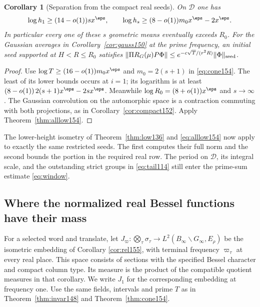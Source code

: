 \documentclass[a4paper,11pt]{article}
\newtheorem{corollary}[proposition]{Corollary}
\theoremstyle{definition}
\theoremstyle{remark}
\numberwithin{equation}{section}
\begin{document}
\begin{corollary}[Separation from the compact real seeds]
\label{cor:far154}
On \(\mathcal D\) one has
\[
          \log h_1\ge(14-o(1))s x^\eps,\qquad
          \log h_s\ge(8-o(1))m_0x^\eps-2x^\eps .
\]
In particular every one of these \(s\) geometric means
eventually exceeds \(R_0\). For the Gaussian averages in
Corollary~\ref{cor:gauss150} at the prime frequency,
an initial seed supported at \(H<R\le R_0\) satisfies
\(\|\Pi R_G(\mu)P\Phi\|\le
e^{-c\sqrt T/(r^2R)}\|\Phi\|_{\rm seed}\).
\end{corollary}
\begin{proof}
Use \(\log T\ge(16-o(1))m_0x^\eps\) and \(m_0=2(s+1)\)
in \eqref{eq:cone154}. The least of its lower bounds occurs
at \(i=1\); its logarithm is at least
\((8-o(1))\,2(s+1)x^\eps-2s x^\eps\).
Meanwhile \(\log R_0=(8+o(1))x^\eps\) and \(s\to\infty\).
The Gaussian convolution on the automorphic space is a
contraction commuting with both projections, as in
Corollary~\ref{cor:compact152}. Apply Theorem~\ref{thm:alllow154}.
\end{proof}

The lower-height isometry of Theorem~\ref{thm:low136} and
\eqref{eq:alllow154} now apply to exactly the same restricted
seeds. The first computes their full norm and the second
bounds the portion in the required real row. The period on
\(\mathcal D\), its integral scale, and the outstanding strict
groups in \eqref{eq:tail114} still enter the prime-sum estimate
\eqref{eq:window}.

\subsection{Where the normalized real Bessel functions have their mass}\label{nav:VII-25}
For a selected word and translate, let
\(J_\varpi:\bigotimes_\tau\sigma_\tau\to
L^2(B_\infty\backslash G_\infty,E_\rho)\) be the isometric
embedding of Corollary \ref{cor:rel155}, with terminal frequency \(\varpi_\tau\) at
every real place. This space consists of sections with the
specified Bessel character and compact column type. Its
measure is the product of the compatible quotient measures
in that corollary. We write \(J_1\) for the corresponding
embedding at frequency one. Use the same fields, intervals
and prime \(T\) as in Theorem~\ref{thm:invar148} and
Theorem~\ref{thm:cone154}.
\end{document}
